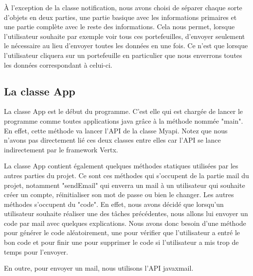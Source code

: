 \begin{flushleft}
À l'exception de la classe notification, nous avons choisi de séparer chaque sorte d'objets en deux parties, une partie basique avec les informations primaires et une partie complète avec le reste des informations. Cela nous permet, lorsque l'utilisateur souhaite par exemple voir tous ces portefeuilles, d'envoyer seulement le nécessaire au lieu d'envoyer toutes les données en une fois. Ce n'est que lorsque l'utilisateur cliquera sur un portefeuille en particulier que nous enverrons toutes les données correspondant à celui-ci.
\end{flushleft}
\newpage
\subsection{La classe App}

\begin{flushleft}
La classe App est le début du programme. C'est elle qui est chargée de lancer le programme comme toutes applications java grâce à la méthode nommée "main". En effet, cette méthode va lancer l'API de la classe Myapi. Notez que nous n'avons pas directement lié ces deux classes entre elles car l'API se lance indirectement par le framework Vertx.
\end{flushleft}

\begin{flushleft}
La classe App contient également quelques méthodes statiques utilisées par les autres parties du projet. Ce sont ces méthodes qui s'occupent de la partie mail du projet, notamment "sendEmail" qui enverra un mail à un utilisateur qui souhaite créer un compte, réinitialiser son mot de passe ou bien le changer. Les autres méthodes s'occupent du "code". En effet, nous avons décidé que lorsqu'un utilisateur souhaite réaliser une des tâches précédentes, nous allons lui envoyer un code par mail avec quelques explications. Nous avons donc besoin d'une méthode pour générer le code aléatoirement, une pour vérifier que l'utilisateur a entré le bon code et pour finir une pour supprimer le code si l'utilisateur a mis trop de temps pour l'envoyer.
\end{flushleft}

\begin{flushleft}
En outre, pour envoyer un mail, nous utilisons l'API javaxmail.
\end{flushleft}

